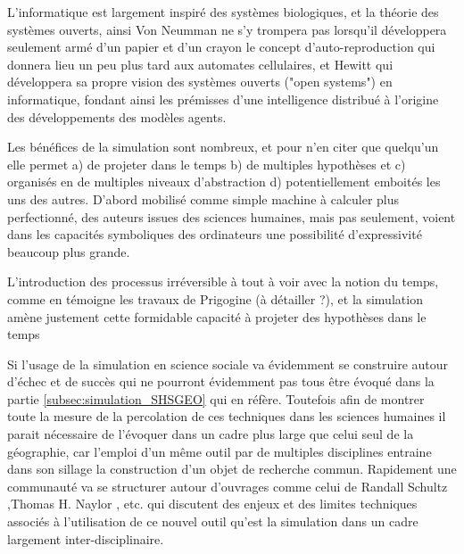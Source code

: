 
L'informatique est largement inspiré des systèmes biologiques, et la théorie des systèmes ouverts, ainsi Von Neumman ne s'y trompera pas lorsqu'il développera seulement armé d'un papier et d'un crayon le concept d'auto-reproduction qui donnera lieu un peu plus tard aux automates cellulaires, et Hewitt qui développera sa propre vision des systèmes ouverts ("open systems") en informatique, fondant ainsi les prémisses d'une intelligence distribué à l'origine des développements des modèles agents.

Les bénéfices de la simulation sont nombreux, et pour n'en citer que quelqu'un elle permet a) de projeter dans le temps b) de multiples hypothèses et c) organisés en de multiples niveaux d'abstraction d) potentiellement emboités les uns des autres. D'abord mobilisé comme simple machine à calculer plus perfectionné, des auteurs issues des sciences humaines, mais pas seulement, voient dans les capacités symboliques des ordinateurs une possibilité d'expressivité beaucoup plus grande.

L'introduction des processus irréversible à tout à voir avec la notion du temps, comme en témoigne les travaux de Prigogine (à détailler ?), et la simulation amène justement cette formidable capacité à projeter des hypothèses dans le temps 


Si l'usage de la simulation en science sociale va évidemment se construire autour d'échec et de succès qui ne pourront évidemment pas tous être évoqué dans la partie \ref{subsec:simulation_SHSGEO} qui en réfère. Toutefois afin de montrer toute la mesure de la percolation de ces techniques dans les sciences humaines il parait nécessaire de l'évoquer dans un cadre plus large que celui seul de la géographie, car l'emploi d'un même outil par de multiples disciplines entraine dans son sillage la construction d'un objet de recherche commun. Rapidement une communauté va se structurer autour d'ouvrages comme celui de Randall Schultz \autocite{Schultz1972} ,Thomas H. Naylor \autocite{Naylor1966}, etc. qui discutent des enjeux et des limites techniques associés à l'utilisation de ce nouvel outil qu'est la simulation dans un cadre largement inter-disciplinaire. 

